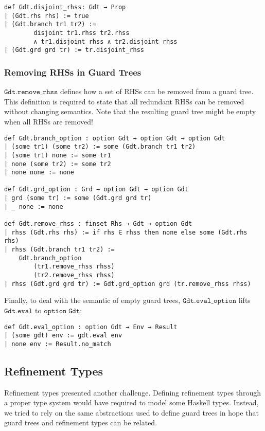 \begin{verbatim}
def Gdt.disjoint_rhss: Gdt → Prop
| (Gdt.rhs rhs) := true
| (Gdt.branch tr1 tr2) :=
        disjoint tr1.rhss tr2.rhss
        ∧ tr1.disjoint_rhss ∧ tr2.disjoint_rhss
| (Gdt.grd grd tr) := tr.disjoint_rhss
\end{verbatim}

\subsubsection{Removing RHSs in Guard Trees}

$\mathtt{Gdt.remove\_rhss}$ defines how a set of RHSs can be removed from a guard tree.
This definition is required to state that all redundant RHSs can be removed without changing semantics.
Note that the resulting guard tree might be empty when all RHSs are removed!

\begin{verbatim}
def Gdt.branch_option : option Gdt → option Gdt → option Gdt
| (some tr1) (some tr2) := some (Gdt.branch tr1 tr2)
| (some tr1) none := some tr1
| none (some tr2) := some tr2
| none none := none

def Gdt.grd_option : Grd → option Gdt → option Gdt
| grd (some tr) := some (Gdt.grd grd tr)
| _ none := none

def Gdt.remove_rhss : finset Rhs → Gdt → option Gdt
| rhss (Gdt.rhs rhs) := if rhs ∈ rhss then none else some (Gdt.rhs rhs)
| rhss (Gdt.branch tr1 tr2) :=
    Gdt.branch_option
        (tr1.remove_rhss rhss)
        (tr2.remove_rhss rhss)
| rhss (Gdt.grd grd tr) := Gdt.grd_option grd (tr.remove_rhss rhss)
\end{verbatim}

Finally, to deal with the semantic of empty guard trees,
$\mathtt{Gdt.eval\_option}$ lifts $\mathtt{Gdt.eval}$ to $\mathtt{option\;Gdt}$:

\begin{verbatim}
def Gdt.eval_option : option Gdt → Env → Result
| (some gdt) env := gdt.eval env
| none env := Result.no_match
\end{verbatim}

\subsection{Refinement Types}
\label{sec:formalizationRefinementTypes}

Refinement types presented another challenge.
Defining refinement types through a proper type system would have required to model some Haskell types.
Instead, we tried to rely on the same abstractions used to define guard trees in hope that guard trees and refinement types can be related.

